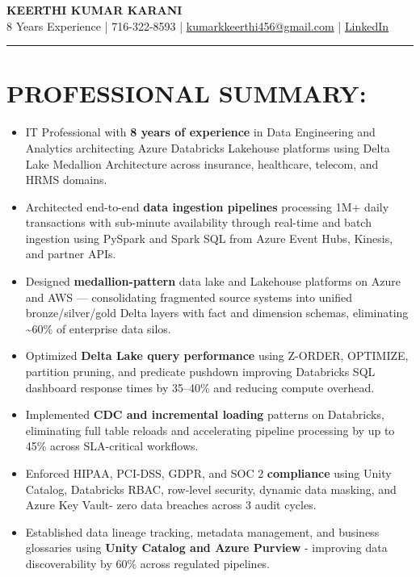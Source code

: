 \documentclass[a4paper,10pt]{article}
\begin{document}
\begin{center}
    {\LARGE \textbf{KEERTHI KUMAR KARANI}} \\
    \vspace{6pt}
    8 Years Experience | 716-322-8593 | \href{mailto:kumarkkeerthi456@gmail.com}{kumarkkeerthi456@gmail.com} | \href{https://www.linkedin.com}{LinkedIn}
\end{center}
\hrule
\vspace{6pt}

\section*{PROFESSIONAL SUMMARY:}
\begin{itemize}
    \item IT Professional with \textbf{8 years of experience} in Data Engineering and Analytics architecting Azure Databricks Lakehouse platforms using Delta Lake Medallion Architecture across insurance, healthcare, telecom, and HRMS domains.
    \item Architected end-to-end \textbf{data ingestion pipelines} processing 1M+ daily transactions with sub-minute availability through real-time and batch ingestion using PySpark and Spark SQL from Azure Event Hubs, Kinesis, and partner APIs.
    \item Designed \textbf{medallion-pattern} data lake and Lakehouse platforms on Azure and AWS — consolidating fragmented source systems into unified bronze/silver/gold Delta layers with fact and dimension schemas, eliminating \textasciitilde 60\% of enterprise data silos.
    \item Optimized \textbf{Delta Lake query performance} using Z-ORDER, OPTIMIZE, partition pruning, and predicate pushdown improving Databricks SQL dashboard response times by 35--40\% and reducing compute overhead.
    \item Implemented \textbf{CDC and incremental loading} patterns on Databricks, eliminating full table reloads and accelerating pipeline processing by up to 45\% across SLA-critical workflows.
    \item Enforced HIPAA, PCI-DSS, GDPR, and SOC 2 \textbf{compliance} using Unity Catalog, Databricks RBAC, row-level security, dynamic data masking, and Azure Key Vault- zero data breaches across 3 audit cycles.
    \item Established data lineage tracking, metadata management, and business glossaries using \textbf{Unity Catalog and Azure Purview} - improving data discoverability by 60\% across regulated pipelines.

\end{itemize}
\end{document}
